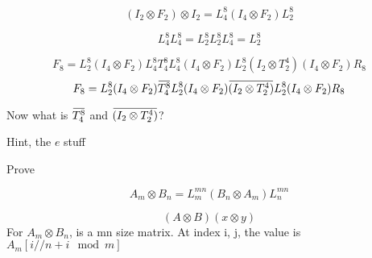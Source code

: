 \documentclass{article}
\newcommand{\overbar}[1]{\mkern 1.5mu\overline{\mkern-1.5mu#1\mkern-1.5mu}\mkern 1.5mu}
\begin{document}
	\begin{equation}
		(I_2 \otimes F_2) \otimes I_2 = L^8_4(I_4 \otimes F_2)L^8_2
	\end{equation}
	
	\begin{equation}
		L^8_4 L^8_4 = L^8_2 L^8_2 L^8_4 = L^8_2
	\end{equation}
	
	\begin{equation}
		F_8=L^8_2 (I_4 \otimes F_2)L^8_4 T^8_4 L^8_4(I_4 \otimes F_2)L^8_2 (I_2 \otimes T^4_2)(I_4 \otimes F_2)R_8
	\end{equation}
	\begin{equation}
		F_8=L^8_2 (I_4 \otimes F_2)\overbar{T^{8}_4} L^8_2(I_4 \otimes F_2) \overbar{(I_2 \otimes T^4_2)}L^8_2(I_4 \otimes F_2)R_8
	\end{equation}

	Now what is $\overbar{T^{8}_4}$ and $\overbar{(I_2 \otimes T^4_2)}$?
	
	Hint, the $e$ stuff
	
	Prove 
	
	\begin{equation}
		A_m \otimes B_n = L^{mn}_m (B_n \otimes A_m) L^{mn}_n
	\end{equation}
	
	\begin{equation}
		(A \otimes B)(x \otimes y)
	\end{equation}
	For $A_m \otimes B_n$, is a mn size matrix. At index i, j, the value is $A_m[i//n+i \mod m]$
\end{document}
